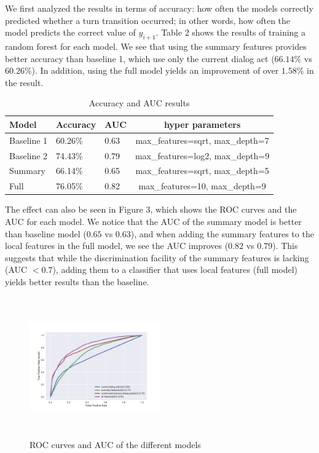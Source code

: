 We first analyzed the results in terms of accuracy: how often the models correctly predicted whether a turn transition occurred; in other words, how often the model predicts the correct value of $y_{i+1}$.
%
Table 2 shows the results of training a random forest for each model.
We see that using the summary features provides better accuracy than baseline 1, which use only the current dialog act ($66.14\%$ vs $60.26\%$). In addition, using the full model yields an improvement of over $1.58\%$ in the result.
%
\begin{table}[ht!]
\scriptsize
   \begin{center}
    \begin{tabular}{| l | l | l | c |}
    \hline
    Model & Accuracy & AUC & hyper parameters\\
    \hline
    Baseline 1      & 60.26\% & 0.63 & \scriptsize{max\_features=sqrt, max\_depth=7} \\
    Baseline 2     & 74.43\% & 0.79 & \scriptsize{max\_features=log2, max\_depth=9}\\
    Summary        & 66.14\% & 0.65 & \scriptsize{max\_features=sqrt, max\_depth=5} \\
    Full           & 76.05\% & 0.82 &\scriptsize{max\_features=10, max\_depth=9}\\
  \hline
\end{tabular}
\end{center}
\vspace{-1.2em}
\caption{Accuracy and AUC results }
\end{table}

The effect can also be seen in Figure 3, which shows the ROC curves and the AUC for each
model. We notice that the AUC of the summary model is better than baseline model ($0.65$ vs $0.63$), and when adding the summary features to the local features in the full model, we see the AUC improves ($0.82$ vs $0.79$). This suggests that while the discrimination facility of the summary features is lacking (AUC $<0.7$), adding them to a classifier that uses local features (full model) yields better results than the baseline.
%
 \begin{figure}[ht!]
 \centering
 \includegraphics[width=0.5\textwidth,width=6cm,height=6cm,keepaspectratio]{../scikitlearn/figures/roc.pdf}\vspace{-1.5em}
 \caption{ROC curves and AUC of the different models \label{overflow}}
 \end{figure}

